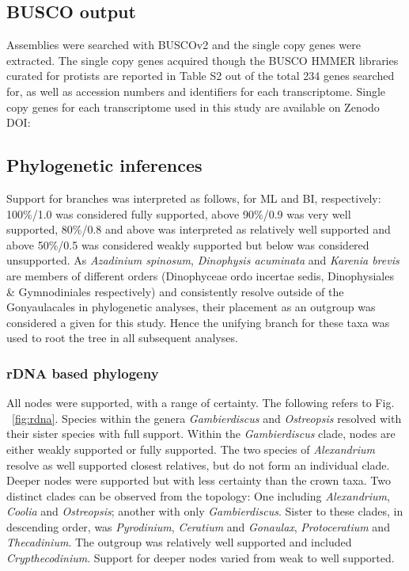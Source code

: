\documentclass[12pt]{article}
\begin{document}
\subsection*{BUSCO output}
Assemblies were searched with BUSCOv2 and the single copy genes were extracted. 
The single copy genes acquired though the BUSCO HMMER libraries curated for protists are reported in Table S2 out of the total 234 genes searched for, as well as accession numbers and identifiers for each transcriptome. 
Single copy genes for each transcriptome used in this study are available on Zenodo DOI:

\subsection*{Phylogenetic inferences}
Support for branches was interpreted as follows, for ML and BI, respectively: 100\%/1.0 was considered fully supported, above 90\%/0.9 was very well supported, 80\%/0.8 and above was interpreted as relatively well supported and above 50\%/0.5 was considered weakly supported but below was considered unsupported.
As \emph{Azadinium spinosum}, \emph{Dinophysis acuminata} and \emph{Karenia brevis} are members of different orders (Dinophyceae ordo incertae sedis, Dinophysiales \& Gymnodiniales respectively) and consistently resolve outside of the Gonyaulacales in phylogenetic analyses, their placement as an outgroup was considered a given for this study. 
Hence the unifying branch for these taxa was used to root the tree in all subsequent analyses.
\subsubsection*{rDNA based phylogeny}
\FloatBarrier 
All nodes were supported, with a range of certainty.
The following refers to Fig. ~\ref{fig:rdna}.
Species within the genera \emph{Gambierdiscus} and \emph{Ostreopsis} resolved with their sister species with full support. 
Within the \emph{Gambierdiscus} clade, nodes are either weakly supported or fully supported. 
The two species of \emph{Alexandrium} resolve as well supported closest relatives, but do not form an individual clade. 
Deeper nodes were supported but with less certainty than the crown taxa. 
Two distinct clades can be observed from the topology: One including \emph{Alexandrium}, \emph{Coolia} and \emph{Ostreopsis}; another with only \emph{Gambierdiscus}. 
Sister to these clades, in descending order, was \emph{Pyrodinium}, \emph{Ceratium} and \emph{Gonaulax}, \emph{Protoceratium} and \emph{Thecadinium}. 
The outgroup was relatively well supported and included \emph{Crypthecodinium}. 
Support for deeper nodes varied from weak to well supported.
\end{document}
